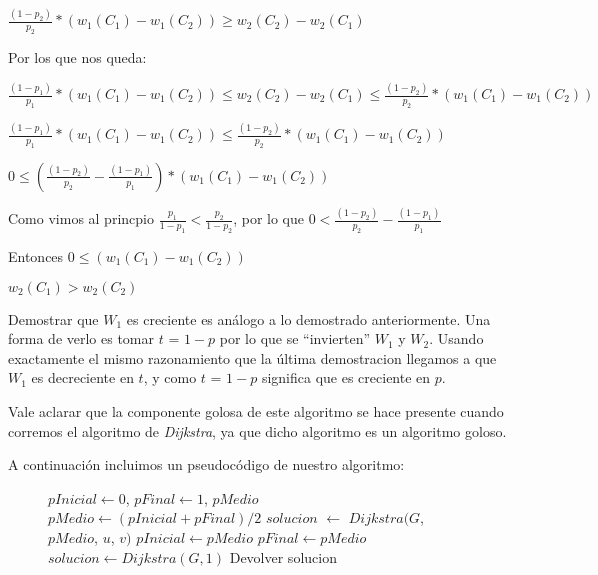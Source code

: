 $\frac{(1-p_2)}{p_2}*(w_1(C_1) - w_1(C_2)) \geq  w_2(C_2) - w_2(C_1) $

Por los que nos queda:

$\frac{(1-p_1)}{p_1}*(w_1(C_1) - w_1(C_2)) \leq  w_2(C_2) - w_2(C_1) \leq \frac{(1-p_2)}{p_2}*(w_1(C_1) - w_1(C_2))$

$\frac{(1-p_1)}{p_1}*(w_1(C_1) - w_1(C_2)) \leq \frac{(1-p_2)}{p_2}*(w_1(C_1) - w_1(C_2))$

$ 0 \leq (\frac{(1-p_2)}{p_2} - \frac{(1-p_1)}{p_1})*(w_1(C_1) - w_1(C_2))$

Como vimos al princpio $\frac{p_1}{1-p_1} < \frac{p_2}{1-p_2}$, por lo que $0 < \frac{(1-p_2)}{p_2} - \frac{(1-p_1)}{p_1} $

Entonces $ 0 \leq (w_1(C_1) - w_1(C_2))$

$w_2(C_1) > w_2(C_2)$

Demostrar que $W_1$ es creciente es análogo a lo demostrado anteriormente. Una forma de verlo es tomar $t$ = $1-p$ por lo que se ``invierten'' $W_1$ y $W_2$. Usando exactamente el mismo razonamiento que la última demostracion llegamos a que $W_1$ es decreciente en $t$, y como $t$ = $1-p$ significa que es creciente en $p$.

Vale aclarar que la componente golosa de este algoritmo se hace presente cuando corremos el algoritmo de \emph{Dijkstra}, ya que dicho algoritmo es un algoritmo goloso.

A continuación incluimos un pseudocódigo de nuestro algoritmo:

\begin{center}
 \begin{figure}[H]
  \begin{pseudo}
    \State $pInicial \leftarrow 0$, $pFinal \leftarrow 1$, $pMedio$
      \State $pMedio \leftarrow (pInicial + pFinal)/2$
      \State $solucion$ $\leftarrow$ $Dijkstra(G$, $pMedio$, $u$, $v)$
	 \State $pInicial \leftarrow pMedio$
      \Else
	 \State $pFinal \leftarrow pMedio$
      \EndIf
    \EndFor
      \State $solucion \leftarrow Dijkstra(G, 1)$
    \EndIf
    \State Devolver solucion
   \EndProcedure
  \end{pseudo}
 \end{figure}
\end{center}